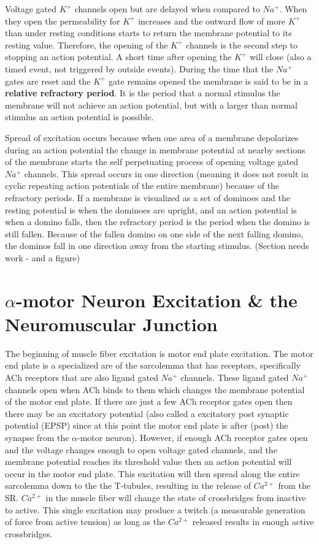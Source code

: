 
Voltage gated $K^+$ channels open but are delayed when compared to $Na^+$. When they open the permeability for $K^+$ increases and the outward flow of more $K^+$ than under resting conditions starts to return the membrane potential to its resting value. Therefore, the opening of the $K^+$ channels is the second step to stopping an action potential. A short time after opening the $K^+$ will close (also a timed event, not triggered by outside events). During the time that the $Na^+$ gates are reset and the $K^+$ gate remains opened the membrane is said to be in a \textbf{relative refractory period}. It is the period that a normal stimulus the membrane will not achieve an action potential, but with a larger than normal stimulus an action potential is possible. 

Spread of excitation occurs because when one area of a membrane depolarizes during an action potential the change in membrane potential at nearby sections of the membrane starts the self perpetuating process of opening voltage gated $Na^+$ channels. This spread occurs in one direction (meaning it does not result in cyclic repeating action potentials of the entire membrane) because of the refractory periods. If a membrane is visualized as a set of dominoes and the resting potential is when the dominoes are upright, and an action potential is when a domino falls, then the refractory period is the period when the domino is still fallen. Because of the fallen domino on one side of the next falling domino, the dominos fall in one direction away from the starting stimulus. (Section needs work - and a figure)

\section{$\alpha$-motor Neuron Excitation \& the Neuromuscular Junction}

The beginning of muscle fiber excitation is motor end plate excitation. The motor end plate is a specialized are of the sarcolemma that has receptors, specifically ACh receptors that are also ligand gated $Na^+$ channels. These ligand gated $Na^+$ channels open when ACh binds to them which changes the membrane potential of the motor end plate. If there are just a few ACh receptor gates open then there may be an excitatory potential (also called a excitatory post synaptic potential (EPSP) since at this point the motor end plate is after (post) the synapse from the $\alpha$-motor neuron). However, if enough ACh receptor gates open and the voltage changes enough to open voltage gated channels, and the membrane potential reaches its threshold value then an action potential will occur in the motor end plate. This excitation will then spread along the entire sarcolemma down to the the T-tubules, resulting in the release of $Ca^{2+}$ from the SR. $Ca^{2+}$ in the muscle fiber will change the state of crossbridges from inactive to active. This single excitation may produce a twitch (a measurable generation of force from active tension) as long as the $Ca^{2+}$ released results in enough active crossbridges. 

